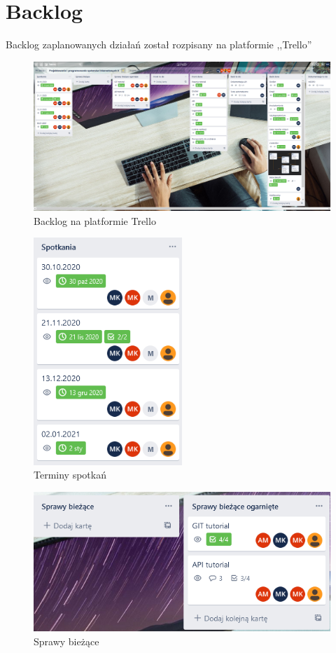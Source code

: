 \documentclass[12pt,a4paper]{article}
\begin{document}
	\section{Backlog}
		\indent Backlog zaplanowanych działań został rozpisany na platformie ,,Trello''\\
		\begin{figure}[H]
			\centering
			\includegraphics[width=\textwidth]{img/backlog.png}
			\caption{Backlog na platformie Trello}
			\label{fig:trello-backlog}
		\end{figure}
		\begin{figure}[H]
			\centering
			\includegraphics[width=0.5\textwidth]{img/spotkania.png}
			\caption{Terminy spotkań}
			\label{fig:trello-spotkania}
		\end{figure}
		\begin{figure}[H]
			\centering
			\includegraphics[width=\textwidth]{img/sprawy_biezace.png}
			\caption{Sprawy bieżące}
			\label{fig:trello-sprawy}
		\end{figure}
\end{document}
